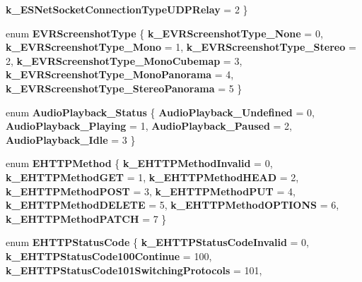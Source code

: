 \begin{DoxyCompactItemize}
{\bfseries k\+\_\+\+E\+S\+Net\+Socket\+Connection\+Type\+U\+D\+P\+Relay} = 2
 \}
\item 
\mbox{\label{namespace_valve_1_1_steamworks_a2899887244746147e83b734cbff669f6}} 
enum {\bfseries E\+V\+R\+Screenshot\+Type} \{ \newline
{\bfseries k\+\_\+\+E\+V\+R\+Screenshot\+Type\+\_\+\+None} = 0, 
{\bfseries k\+\_\+\+E\+V\+R\+Screenshot\+Type\+\_\+\+Mono} = 1, 
{\bfseries k\+\_\+\+E\+V\+R\+Screenshot\+Type\+\_\+\+Stereo} = 2, 
{\bfseries k\+\_\+\+E\+V\+R\+Screenshot\+Type\+\_\+\+Mono\+Cubemap} = 3, 
\newline
{\bfseries k\+\_\+\+E\+V\+R\+Screenshot\+Type\+\_\+\+Mono\+Panorama} = 4, 
{\bfseries k\+\_\+\+E\+V\+R\+Screenshot\+Type\+\_\+\+Stereo\+Panorama} = 5
 \}
\item 
\mbox{\label{namespace_valve_1_1_steamworks_a7e82ee7851c6d5719ce8d2dd9e355555}} 
enum {\bfseries Audio\+Playback\+\_\+\+Status} \{ {\bfseries Audio\+Playback\+\_\+\+Undefined} = 0, 
{\bfseries Audio\+Playback\+\_\+\+Playing} = 1, 
{\bfseries Audio\+Playback\+\_\+\+Paused} = 2, 
{\bfseries Audio\+Playback\+\_\+\+Idle} = 3
 \}
\item 
\mbox{\label{namespace_valve_1_1_steamworks_a5b19d4ffc1134884682b3abf014ccfb9}} 
enum {\bfseries E\+H\+T\+T\+P\+Method} \{ \newline
{\bfseries k\+\_\+\+E\+H\+T\+T\+P\+Method\+Invalid} = 0, 
{\bfseries k\+\_\+\+E\+H\+T\+T\+P\+Method\+G\+ET} = 1, 
{\bfseries k\+\_\+\+E\+H\+T\+T\+P\+Method\+H\+E\+AD} = 2, 
{\bfseries k\+\_\+\+E\+H\+T\+T\+P\+Method\+P\+O\+ST} = 3, 
\newline
{\bfseries k\+\_\+\+E\+H\+T\+T\+P\+Method\+P\+UT} = 4, 
{\bfseries k\+\_\+\+E\+H\+T\+T\+P\+Method\+D\+E\+L\+E\+TE} = 5, 
{\bfseries k\+\_\+\+E\+H\+T\+T\+P\+Method\+O\+P\+T\+I\+O\+NS} = 6, 
{\bfseries k\+\_\+\+E\+H\+T\+T\+P\+Method\+P\+A\+T\+CH} = 7
 \}
\item 
\mbox{\label{namespace_valve_1_1_steamworks_ab62fb77def417ee5c534d8dd0ccd7b7e}} 
enum {\bfseries E\+H\+T\+T\+P\+Status\+Code} \{ \newline
{\bfseries k\+\_\+\+E\+H\+T\+T\+P\+Status\+Code\+Invalid} = 0, 
{\bfseries k\+\_\+\+E\+H\+T\+T\+P\+Status\+Code100\+Continue} = 100, 
{\bfseries k\+\_\+\+E\+H\+T\+T\+P\+Status\+Code101\+Switching\+Protocols} = 101, 

\end{DoxyCompactItemize}
